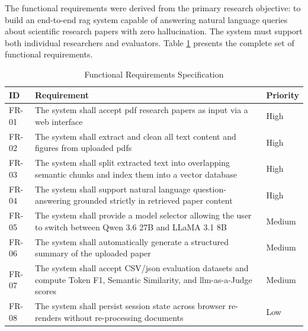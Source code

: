 The functional requirements were derived from the primary research objective: to build an end-to-end \gls{rag} system capable of answering natural language queries about scientific research papers with zero hallucination. The system must support both individual researchers and evaluators. Table \ref{tab:fr} presents the complete set of functional requirements.

\begin{table}[H]

\centering

\caption{Functional Requirements Specification}

\label{tab:fr}

\begin{tabular}{|p{1.2cm}|p{9cm}|p{2cm}|}

\hline

\textbf{ID} & \textbf{Requirement} & \textbf{Priority} \\

\hline

FR-01 & The system shall accept \gls{pdf} research papers as input via a web interface & High \\

\hline

FR-02 & The system shall extract and clean all text content and figures from uploaded \gls{pdf}s & High \\

\hline

FR-03 & The system shall split extracted text into overlapping semantic chunks and index them into a vector database & High \\

\hline

FR-04 & The system shall support natural language question-answering grounded strictly in retrieved paper content & High \\

\hline

FR-05 & The system shall provide a model selector allowing the user to switch between Qwen 3.6 27B and LLaMA 3.1 8B & Medium \\

\hline

FR-06 & The system shall automatically generate a structured summary of the uploaded paper & Medium \\

\hline

FR-07 & The system shall accept CSV/\gls{json} evaluation datasets and compute Token F1, Semantic Similarity, and \gls{llm}-as-a-Judge scores & Medium \\

\hline

FR-08 & The system shall persist session state across browser re-renders without re-processing documents & Low \\

\hline

\end{tabular}

\end{table}

